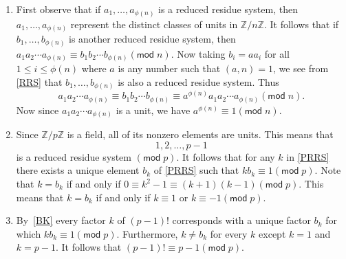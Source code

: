 \documentclass[12pt]{article}
\renewcommand{\pmod}[1]{\left(\mathsf{mod}\;#1\right)}
\begin{document}
\begin{enumerate}
\item %
First observe that if $a_1,\ldots,a_{\phi\left(n\right)}$
is a reduced residue system, then 
$a_1,\ldots,a_{\phi\left(n\right)}$ represent the distinct
classes of units in $\mathbb{Z}/n\mathbb{Z}$.
It follows that if $b_1,\ldots,b_{\phi\left(n\right)}$
is another reduced residue system, then
$a_1a_2\cdots a_{\phi\left(n\right)}
\equiv b_1b_2\cdots b_{\phi\left(n\right)}\pmod{n}$.
Now taking $b_i=aa_i$ for all $1\le i\le\phi\left(n\right)$
where $a$ is any number such that $\left(a,n\right)=1$,
we see from \autoref{RRS} that
$b_1,\ldots,b_{\phi\left(n\right)}$
is also a reduced residue system. Thus
\[a_1a_2\cdots a_{\phi\left(n\right)}
\equiv b_1b_2\cdots b_{\phi\left(n\right)}\equiv
a^{\phi\left(n\right)}a_1a_2\cdots a_{\phi\left(n\right)}
\pmod{n}.\]
Now since
$a_1a_2\cdots a_{\phi\left(n\right)}$ is a unit, we have
$a^{\phi\left(n\right)}\equiv 1\pmod{n}$.

\item\label{BK} %
Since $\mathbb{Z}/p\mathbb{Z}$ is a field, all of its
nonzero elements are units. This means that
\begin{equation}\label{PRRS}
1,2,\ldots,p-1
\end{equation}
is a reduced residue system $\pmod{p}$. It follows
that for any $k$ in \autoref{PRRS} there exists
a unique element $b_k$ of \autoref{PRRS} such that
$kb_k\equiv 1\pmod{p}$.
Note that $k=b_k$ if and only if $0\equiv k^2-1\equiv
\left(k+1\right)\left(k-1\right)\pmod{p}$.
This means that $k=b_k$ if and only if $k\equiv 1$
or $k\equiv -1\pmod{p}$.

\item %
By~\autoref{BK} every factor $k$ of $\left(p-1\right)!$ corresponds
with a unique factor $b_k$ for which $kb_k\equiv 1\pmod{p}$.
Furthermore, $k\ne b_k$ for every $k$ except $k=1$ and $k=p-1$.
It follows that $\left(p-1\right)!\equiv p-1\pmod{p}$.

\end{enumerate}
\end{document}
